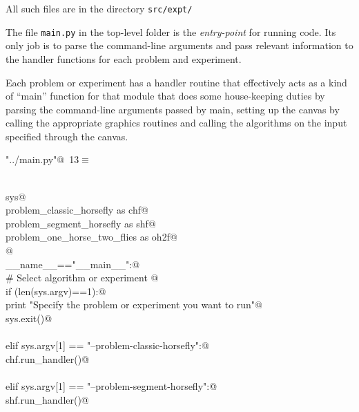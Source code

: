 \documentclass[12pt]{report}
\begin{document}
 All such files are in the directory \texttt{src/expt/}

\newchunk The file \verb|main.py| in the top-level folder is the \textit{entry-point} for running code. 
Its only job is to parse the command-line arguments and pass relevant information to the handler 
functions for each problem and experiment. 

Each problem or experiment has a handler routine 
that effectively acts as a kind of ``main'' function for that module that does some house-keeping duties by 
parsing the command-line arguments passed  by main, setting up the canvas by calling the appropriate
graphics routines and calling the algorithms on the input specified through the canvas. 

\begin{flushleft} \small
\begin{minipage}{\linewidth}\label{scrap1}\raggedright\small
{} \verb@"../main.py"@\nobreak\ {\footnotesize {13}}$\equiv$
\vspace{-1ex}
\begin{list}{}{} \item
\mbox{}\verb@@\\
\mbox{}\verb@import sys@\\
\mbox{}\verb@import problem_classic_horsefly as chf@\\
\mbox{}\verb@import problem_segment_horsefly as shf@\\
\mbox{}\verb@import problem_one_horse_two_flies as oh2f@\\
\mbox{}\verb@   @\\
\mbox{}\verb@if __name__=="__main__":@\\
\mbox{}\verb@     # Select algorithm or experiment @\\
\mbox{}\verb@     if (len(sys.argv)==1):@\\
\mbox{}\verb@          print "Specify the problem or experiment you want to run"@\\
\mbox{}\verb@          sys.exit()@\\
\mbox{}\verb@@\\
\mbox{}\verb@     elif sys.argv[1] == "--problem-classic-horsefly":@\\
\mbox{}\verb@          chf.run_handler()@\\
\mbox{}\verb@@\\
\mbox{}\verb@     elif sys.argv[1] == "--problem-segment-horsefly":@\\
\mbox{}\verb@          shf.run_handler()@\\

\end{list}
\end{minipage}
\end{flushleft}
\end{document}
